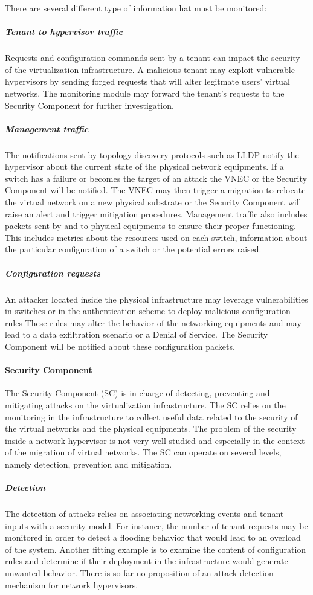 There are several different type of information hat must be monitored:

\subparagraph{Tenant to hypervisor traffic} Requests and configuration commands sent by a tenant can impact the security of the virtualization infrastructure. A malicious tenant may exploit vulnerable hypervisors by sending forged requests that will alter legitmate users' virtual networks. The monitoring module may forward the tenant's requests to the Security Component for further investigation.

\subparagraph{Management traffic} 
The notifications sent by topology discovery protocols such as LLDP notify the hypervisor about the current state of the physical network equipments. If a switch has a failure or becomes the target of an attack the VNEC or the Security Component will be notified. The VNEC may then trigger a migration to relocate the virtual network on a new physical substrate or the Security Component will raise an alert and trigger mitigation procedures.
Management traffic also includes packets sent by and to physical equipments to ensure their proper functioning.
This includes metrics about the resources used on each switch, information about the particular configuration of a switch or the potential errors raised.

\subparagraph{Configuration requests} An attacker located inside the physical infrastructure may leverage vulnerabilities in switches or in the authentication scheme to deploy malicious configuration rules These rules may alter the behavior of the networking equipments and may lead to a data exfiltration scenario or a Denial of Service.
The Security Component will be notified about these configuration packets.

\paragraph{Security Component}
The Security Component (SC) is in charge of detecting, preventing and mitigating attacks on the virtualization infrastructure. The SC relies on the monitoring in the infrastructure to collect useful data related to the security of the virtual networks and the physical equipments.
The problem of the security inside a network hypervisor is not very well studied and especially in the context of the migration of virtual networks.
The SC can operate on several levels, namely detection, prevention and mitigation.

\subparagraph{Detection}
The detection of attacks relies on associating networking events and tenant inputs with a security model.
For instance, the number of tenant requests may be monitored in order to detect a flooding behavior that would lead to an overload of the system. Another fitting example is to examine the content of configuration rules and determine if their deployment in the infrastructure would generate unwanted behavior.
There is so far no proposition of an attack detection mechanism for network hypervisors.


